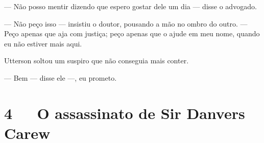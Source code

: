 --- Não posso mentir dizendo que espero gostar dele um dia --- disse o
advogado.

--- Não peço isso --- insistiu o doutor, pousando a mão no ombro do outro.
--- Peço apenas que aja com justiça; peço apenas que o ajude em meu nome,
quando eu não estiver mais aqui.

Utterson soltou um suspiro que não conseguia mais conter.

--- Bem --- disse ele ---, eu prometo.


\chapter[4\ \ \ O assassinato de Sir Danvers Carew]{4\ \ \ O assassinato de Sir Danvers Carew}

